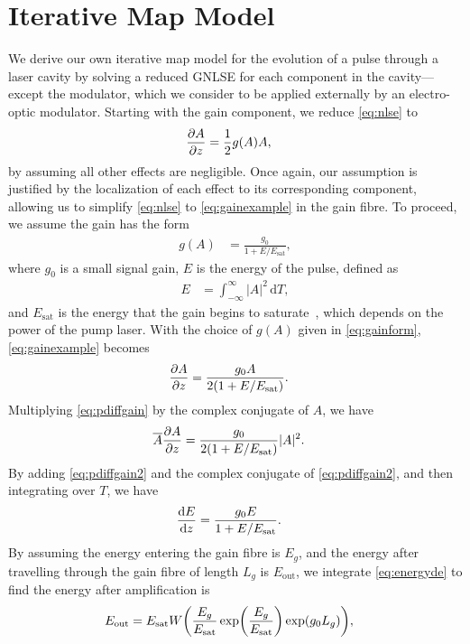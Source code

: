 \documentclass[9pt,twocolumn,twoside]{osajnl}
\let\originalleft\left
\let\originalright\right
\renewcommand{\left}{\mathopen{}\mathclose\bgroup\originalleft}
\renewcommand{\right}{\aftergroup\egroup\originalright}
\providecommand{\df}{\textrm{d}} %
\newcommand{\diff}[3][\hspace{-0.5pt}]{\frac{\df^{#1}#2}{\df{#3}^{#1}}} %
\newcommand{\pdiff}[3][\hspace{-0.5pt}]{\frac{\partial^{#1}#2}{\partial{#3}^{#1}}} %
\newcommand{\Es}{E_{\textrm{sat}}} %
\begin{document}
\section{Iterative Map Model}
\label{sec:model}
We derive our own iterative map model for the evolution of a pulse through a laser cavity by solving a reduced GNLSE for each component in the cavity---except the modulator, which we consider to be applied externally by an electro-optic modulator. Starting with the gain component, we reduce \eqref{eq:nlse} to 
\begin{align}
	\pdiff{A}{z} &= \frac{1}{2}g(A)A,
	\label{eq:gainexample}
\end{align}
by assuming all other effects are negligible. Once again, our assumption is justified by the localization of each effect to its corresponding component, allowing us to simplify \eqref{eq:nlse} to \eqref{eq:gainexample} in the gain fibre. To proceed, we assume the gain has the form
\begin{align}
	g(A) &= \frac{g_0}{1 + E / \Es},
	\label{eq:gainform}
\end{align}
where $g_0$ is a small signal gain, $E$ is the energy of the pulse, defined as
\begin{align}
	E &= \int_{-\infty}^\infty |A|^2 \, \df T,
	\label{eq:energy}
\end{align}
and $\Es$ is the energy that the gain begins to saturate~\cite{haus1984, shtyrina2017, silfvast2004}, which depends on the power of the pump laser. With the choice of $g(A)$ given in \eqref{eq:gainform}, \eqref{eq:gainexample} becomes
\begin{align}
	\pdiff{A}{z} &= \frac{g_0 A}{2 \left( 1 + E / \Es \right)}.
	\label{eq:pdiffgain}
\end{align}
Multiplying \eqref{eq:pdiffgain} by the complex conjugate of $A$, we have
\begin{align}
	\overline{A} \pdiff{A}{z} &= \frac{g_0}{2 \left( 1 + E / \Es \right)} |A|^2.
	\label{eq:pdiffgain2}
\end{align}
By adding \eqref{eq:pdiffgain2} and the complex conjugate of \eqref{eq:pdiffgain2}, and then integrating over $T$, we have
\begin{align}
	\diff{E}{z} &= \frac{g_0 E}{1 + E / \Es}.
	\label{eq:energyde}
\end{align}
By assuming the energy entering the gain fibre is $E_g$, and the energy after travelling through the gain fibre of length $L_g$ is $E_{\text{out}}$, we integrate \eqref{eq:energyde} to find the energy after amplification is
\begin{align}
	\label{eq:engain}
	E_{\text{out}} &= \Es W \left( \frac{E_g}{\Es} \exp \left( \frac{E_g}{\Es} \right) \exp( g_0 L_g ) \right),
\end{align}
\end{document}
